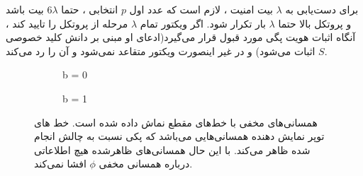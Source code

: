 \documentclass[12pt,a4paper]{article}
\begin{document}
برای دست‌یابی به 
$\lambda$
بیت امنیت ، لازم است که عدد اول 
$p$
انتخابی ،‌ حتما
$6\lambda$
بیت باشد و پروتکل بالا حتما 
$\lambda$
بار تکرار شود. اگر ویکتور تمام 
$\lambda$
مرحله از پروتکل را تایید کند ، آنگاه اثبات هویت پگی مورد قبول قرار می‌گیرد(ادعای او مبنی بر دانش کلید خصوصی
$S$
 اثبات می‌شود) و در غیر اینصورت ویکتور متقاعد نمی‌شود و آن را رد می‌کند. 


\begin{figure}
	\centering
	\begin{subfigure}{0.4\textwidth}
		\centering
		\caption{b = 0}
		\label{fig:sub1}
		
	\end{subfigure}
	
	\begin{subfigure}{0.4\textwidth}
		\centering
		\caption{b = 1}
		\label{fig:sub2}
		
	\end{subfigure}%
	\caption{
		همسانی‌های مخفی با خط‌های مقطع نماش داده شده است. خط های توپر نمایش دهنده همسانی‌هایی می‌باشد که پکی نسبت به چالش انجام شده ظاهر می‌کند. با این حال همسانی‌های ظاهرشده هیچ اطلاعاتی درباره همسانی مخفی
		$\phi$
		افشا نمی‌کند.	
	}
	\label{fig:challenge}
\end{figure}
\end{document}
